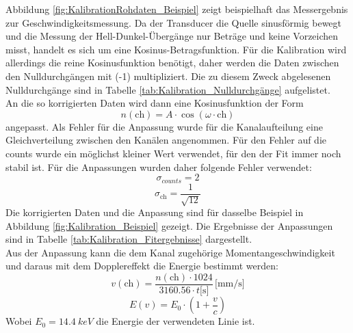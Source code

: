 \documentclass[12pt,a4paper]{article}
\begin{document}
Abbildung \ref{fig:KalibrationRohdaten_Beispiel} zeigt beispielhaft das Messergebnis zur Geschwindigkeitsmessung. Da der Transducer die Quelle sinusförmig bewegt und die Messung der Hell-Dunkel-Übergänge nur Beträge und keine Vorzeichen misst, handelt es sich um eine Kosinus-Betragsfunktion. Für die Kalibration wird allerdings die reine Kosinusfunktion benötigt, daher werden die Daten zwischen den Nulldurchgängen mit (-1) multipliziert. Die zu diesem Zweck abgelesenen Nulldurchgänge sind in Tabelle \ref{tab:Kalibration_Nulldurchgänge} aufgelistet. \\
An die so korrigierten Daten wird dann eine Kosinusfunktion der Form
\begin{equation*}
n(\textrm{ch}) = A \cdot \cos (\omega \cdot \textrm{ch})
\end{equation*}
angepasst. Als Fehler für die Anpassung wurde für die Kanalaufteilung eine Gleichverteilung zwischen den Kanälen angenommen. Für den Fehler auf die counts wurde ein möglichst kleiner Wert verwendet, für den der Fit immer noch stabil ist. Für die Anpassungen wurden daher folgende Fehler verwendet:
\begin{equation*}
\sigma _{counts} = 2
\end{equation*}
\begin{equation*}
\sigma _\textrm{ch} = \dfrac{1}{\sqrt{12}}
\end{equation*}
Die korrigierten Daten und die Anpassung sind für dasselbe Beispiel in Abbildung \ref{fig:Kalibration_Beispiel} gezeigt. Die Ergebnisse der Anpassungen sind in Tabelle \ref{tab:Kalibration_Fitergebnisse} dargestellt. \\
Aus der Anpassung kann die dem Kanal zugehörige Momentangeschwindigkeit und daraus mit dem Dopplereffekt die Energie bestimmt werden:
\begin{equation*}
v(\textrm{ch}) = \dfrac{n(\textrm{ch}) \cdot 1024}{3160.56 \cdot t \textrm{[s]}} \, \textrm{[mm/s]}
\end{equation*}
\begin{equation*}
E(v) = E_0 \cdot \left(1 + \dfrac{v}{c}\right)
\end{equation*}
Wobei $E_0 = \SI{14,4}{keV}$ die Energie der verwendeten Linie ist.
\end{document}
